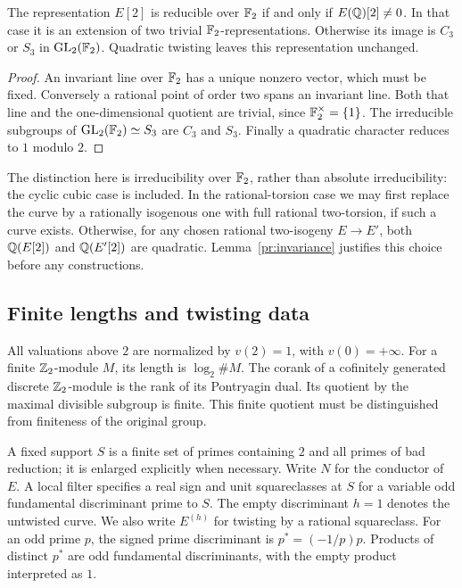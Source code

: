 \begin{lemma}\label{pr:residual-cases}
The representation $E[2]$ is reducible over $\mathbb F_2$ if and only if
$E(\mathbb Q)[2]\ne0$. In that case it is an extension of two trivial
$\mathbb F_2$-representations. Otherwise its image is $C_3$ or $S_3$ in
$\operatorname{GL}_2(\mathbb F_2)$. Quadratic twisting leaves this representation unchanged.
\end{lemma}

\begin{proof}
An invariant line over $\mathbb F_2$ has a unique nonzero vector, which must
be fixed. Conversely a rational point of order two spans an invariant
line. Both that line and the one-dimensional quotient are trivial,
since $\mathbb F_2^\times=\{1\}$. The irreducible subgroups of
$\operatorname{GL}_2(\mathbb F_2)\simeq S_3$ are $C_3$ and $S_3$. Finally a quadratic
character reduces to $1$ modulo $2$.
\end{proof}

The distinction here is irreducibility over $\mathbb F_2$, rather than
absolute irreducibility: the cyclic cubic case is included.
In the rational-torsion case we may first replace the curve by a
rationally isogenous one with full rational two-torsion, if such a
curve exists. Otherwise, for any chosen rational two-isogeny
$E\to E'$, both $\mathbb Q(E[2])$ and $\mathbb Q(E'[2])$ are quadratic.
Lemma~\ref{pr:invariance} justifies this choice before any constructions.

\subsection{Finite lengths and twisting data}

All valuations above $2$ are normalized by $v(2)=1$, with $v(0)=+\infty$.
For a finite $\mathbb Z_2$-module $M$, its length is $\log_2\#M$.
The corank of a cofinitely generated discrete $\mathbb Z_2$-module is the
rank of its Pontryagin dual. Its quotient by the maximal divisible
subgroup is finite. This finite quotient must be distinguished from
finiteness of the original group.

A fixed support $S$ is a finite set of primes containing $2$ and
all primes of bad reduction; it is enlarged explicitly when necessary.
Write $N$ for the conductor of $E$.
A local filter specifies a real sign and unit squareclasses at $S$
for a variable odd fundamental discriminant prime to $S$.
The empty discriminant $h=1$ denotes the untwisted curve.
We also write $E^{(h)}$ for twisting by a rational squareclass.
For an odd prime $p$, the signed prime discriminant is
$p^*=(-1/p)p$. Products of distinct $p^*$ are odd fundamental
discriminants, with the empty product interpreted as $1$.

